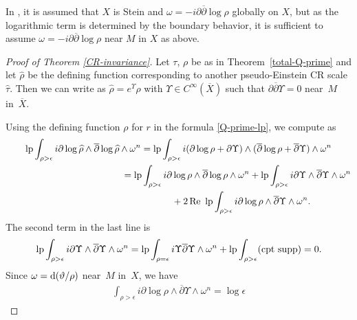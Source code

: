 \documentclass[pdftex]{sigma}
\numberwithin{equation}{section}
\begin{document}
In \cite[Theorem 5.6]{Hirachi}, it is assumed that $X$ is Stein and $\omega=-i\partial\overline{\partial}\log\rho$ globally on $X$, but as the logarithmic term is determined by the boundary behavior, it is suf\/f\/icient to assume $\omega=-i\partial\overline{\partial}\log\rho$ near $M$ in $X$ as above.

\begin{proof}[Proof of Theorem \ref{CR-invariance}] Let $\tau$, $\rho$ be as in Theorem~\ref{total-Q-prime} and let $\widehat\rho$ be the def\/ining function corresponding to another pseudo-Einstein CR scale $\widehat\tau$. Then we can write as $\widehat\rho=e^{\Upsilon}\rho$ with $\Upsilon\in C^\infty(\overline X)$ such that $\partial\overline{\partial}\Upsilon=0$ near~$M$ in~$\overline X$.

Using the def\/ining function $\rho$ for $r$ in the formula \eqref{Q-prime-lp}, we compute as
\begin{gather*}
\operatorname{lp}\int_{\rho>\epsilon} i\partial\log \widehat\rho\wedge \overline{\partial}\log\widehat\rho\wedge \omega^n=
\operatorname{lp}\int_{\rho>\epsilon} i(\partial\log \rho+\partial\Upsilon)\wedge (\overline{\partial}\log\rho+\overline{\partial}\Upsilon)\wedge \omega^n \\
\hphantom{\operatorname{lp}\int_{\rho>\epsilon} i\partial\log \widehat\rho\wedge \overline{\partial}\log\widehat\rho\wedge \omega^n}{}
 =\operatorname{lp}\int_{\rho>\epsilon} i\partial\log\rho\wedge \overline{\partial}\log\rho\wedge \omega^n +\operatorname{lp}\int_{\rho>\epsilon} i\partial\Upsilon\wedge \overline{\partial}\Upsilon\wedge \omega^n \\
\hphantom{\operatorname{lp}\int_{\rho>\epsilon} i\partial\log \widehat\rho\wedge \overline{\partial}\log\widehat\rho\wedge \omega^n=}{}
 +2\operatorname{Re}\ \operatorname{lp}\int_{\rho>\epsilon} i\partial\log\rho\wedge \overline{\partial}\Upsilon\wedge \omega^n.
\end{gather*}
The second term in the last line is
\begin{gather*}
\operatorname{lp}\int_{\rho>\epsilon} i\partial\Upsilon\wedge \overline{\partial}\Upsilon\wedge \omega^n=\operatorname{lp}\int_{\rho=\epsilon} i\Upsilon\overline{\partial}\Upsilon\wedge \omega^n+\operatorname{lp}\int_{\rho>\epsilon}({\rm cpt\ supp})=0.
\end{gather*}
Since $\omega={\rm d}(\vartheta/\rho)$ near~$M$ in~$X$, we have
\begin{gather*}
\int_{\rho>\epsilon} i\partial\log\rho\wedge \overline{\partial}\Upsilon\wedge \omega^n =\log\epsilon

\end{gather*}
\end{proof}
\end{document}
